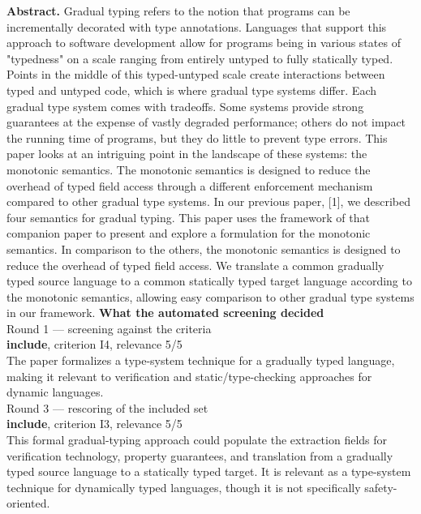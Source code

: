 \documentclass[11pt,a4paper]{article}
\begin{document}
{\small\textbf{Abstract.} Gradual typing refers to the notion that programs can be incrementally decorated with type annotations. Languages that support this approach to software development allow for programs being in various states of "typedness" on a scale ranging from entirely untyped to fully statically typed. Points in the middle of this typed-untyped scale create interactions between typed and untyped code, which is where gradual type systems differ. Each gradual type system comes with tradeoffs. Some systems provide strong guarantees at the expense of vastly degraded performance; others do not impact the running time of programs, but they do little to prevent type errors. This paper looks at an intriguing point in the landscape of these systems: the monotonic semantics. The monotonic semantics is designed to reduce the overhead of typed field access through a different enforcement mechanism compared to other gradual type systems. In our previous paper, [1], we described four semantics for gradual typing. This paper uses the framework of that companion paper to present and explore a formulation for the monotonic semantics. In comparison to the others, the monotonic semantics is designed to reduce the overhead of typed field access. We translate a common gradually typed source language to a common statically typed target language according to the monotonic semantics, allowing easy comparison to other gradual type systems in our framework.}
\vspace{3mm}
\vspace{2.5mm}
{\small\textbf{What the automated screening decided}}\\[2mm]
{\footnotesize\color{soft}Round 1 --- screening against the criteria}\\[0.5mm]
{\small\textbf{include}, criterion I4, relevance 5/5}\\[0.5mm]
{\small The paper formalizes a type-system technique for a gradually typed language, making it relevant to verification and static/type-checking approaches for dynamic languages.}\\[2.5mm]
{\footnotesize\color{soft}Round 3 --- rescoring of the included set}\\[0.5mm]
{\small\textbf{include}, criterion I3, relevance 5/5}\\[0.5mm]
{\small This formal gradual-typing approach could populate the extraction fields for verification technology, property guarantees, and translation from a gradually typed source language to a statically typed target. It is relevant as a type-system technique for dynamically typed languages, though it is not specifically safety-oriented.}\\[2.5mm]
\end{document}
